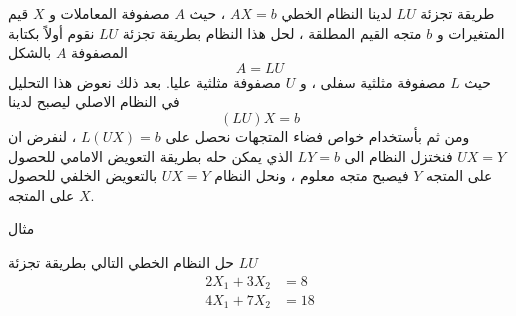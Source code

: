 	\begin{frame}
		\begin{exampleblock}{طريقة تجزئة $LU$}
			لدينا النظام الخطي $AX=b$ ، حيث $A$ مصفوفة المعاملات و $X$ قيم المتغيرات و $b$ متجه القيم المطلقة ، لحل هذا النظام بطريقة تجزئة $LU$  نقوم أولاً بكتابة المصفوفة $A$ بالشكل 
			\begin{equation*}
				A = LU
			\end{equation*}
			حيث $L$ مصفوفة مثلثية سفلى ، و $U$ مصفوفة مثلثية عليا. بعد ذلك نعوض هذا التحليل في النظام الاصلي ليصبح لدينا 
			\[
			(LU)X = b
			\]
			ومن ثم بأستخدام خواص فضاء المتجهات نحصل على $L(UX) = b$ ، لنفرض ان $UX = Y$ فنختزل النظام الى $L Y = b$ الذي يمكن حله بطريقة التعويض الامامي للحصول على المتجه $Y$ فيصبح متجه معلوم ، ونحل النظام $UX = Y$ بالتعويض الخلفي للحصول على المتجه $X$.\\
		\end{exampleblock}
		
		\begin{exampleblock}{مثال}
			
			حل النظام الخطي التالي بطريقة تجزئة $LU$
			\begin{align*}
				2X_1+ 3X_2 &= 8\\
				4X_1 + 7X_2 &= 18
			\end{align*}
		\end{exampleblock}
	\end{frame}
	
